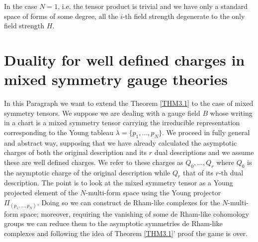 \documentclass[a4paper,12pt]{article}
\begin{document}
In the case $N=1$, i.e. the tensor product is trivial and we have only a standard space of forms of some degree, all the $i$-th field strength degenerate to the only field strength $H$.\\





\section{Duality for well defined charges in mixed symmetry gauge theories}\label{MSTT}
In this Paragraph we want to extend the Theorem \ref{THM3.1} to the case of mixed symmetry tensors. We suppose we are dealing with a gauge field $B$ whose writing in a chart is a mixed symmetry tensor carrying the irreducible representation corresponding to the Young tableau $\lambda=\{p_1,...,p_N\}$.  We proceed in fully general and abstract way, supposing that we have already calculated the asymptotic charges of both the original description and its $r$ dual descriptions and we assume these are well defined charges. We refer to these charges as $Q_0, ..., Q_r$ where $Q_0$ is the asymptotic charge of the original description while $Q_r$ that of its $r$-th dual description. The point is to look at the mixed symmetry tensor as a Young projected element of the $N$-multi-form space using the Young projector $\Pi_{(p_1,...,p_N)}$. Doing so we can construct de Rham-like complexes for the $N$-multi-form space; moreover, requiring the vanishing of some de Rham-like cohomology groups we can reduce them to the asymptotic symmetries de Rham-like complexes and following the idea of Theorem \ref{THM3.1}' proof the game is over. \\
\end{document}

